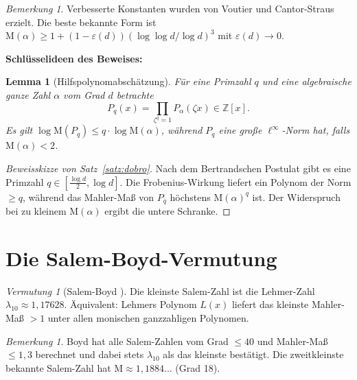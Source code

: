 \documentclass[12pt,a4paper]{amsart}
\newtheorem{lemma}[theorem]{Lemma}
\theoremstyle{definition}
\theoremstyle{remark}
\newtheorem{bemerkung}[theorem]{Bemerkung}
\newtheorem{vermutung}[theorem]{Vermutung}
\newcommand{\Z}{\mathbb{Z}}
\newcommand{\M}{\mathrm{M}}
\begin{document}
\begin{bemerkung}
  Verbesserte Konstanten wurden von Voutier \cite{Voutier1996} und Cantor-Straus
  \cite{CantorStraus1982} erzielt. Die beste bekannte Form ist
  $\M(\alpha) \geq 1 + (1-\varepsilon(d))(\log\log d / \log d)^3$
  mit $\varepsilon(d) \to 0$.
\end{bemerkung}

\textbf{Schlüsselideen des Beweises:}

\begin{lemma}[Hilfspolynomabschätzung]
  Für eine Primzahl $q$ und eine algebraische ganze Zahl $\alpha$ vom Grad $d$ betrachte
  \[
    P_q(x) = \prod_{\zeta^q = 1} P_\alpha(\zeta x) \in \Z[x].
  \]
  Es gilt $\log \M(P_q) \leq q \cdot \log \M(\alpha)$,
  während $P_q$ eine große $\ell^\infty$-Norm hat, falls $\M(\alpha) < 2$.
\end{lemma}

\begin{proof}[Beweisskizze von Satz~\ref{satz:dobro}]
  Nach dem Bertrandschen Postulat gibt es eine Primzahl $q \in [\frac{\log d}{2}, \log d]$.
  Die Frobenius-Wirkung liefert ein Polynom der Norm $\geq q$, während das
  Mahler-Maß von $P_q$ höchstens $\M(\alpha)^q$ ist. Der Widerspruch bei zu kleinem
  $\M(\alpha)$ ergibt die untere Schranke.
\end{proof}

\section{Die Salem-Boyd-Vermutung}\label{sec:salem_boyd}

\begin{vermutung}[Salem-Boyd \cite{Boyd1977}]\label{verm:salemboyd}
  Die kleinste Salem-Zahl ist die Lehmer-Zahl $\lambda_{10} \approx 1{,}17628$.
  Äquivalent: Lehmers Polynom $L(x)$ liefert das kleinste Mahler-Maß $> 1$ unter allen
  monischen ganzzahligen Polynomen.
\end{vermutung}

\begin{bemerkung}
  Boyd \cite{Boyd1977,Boyd1981} hat alle Salem-Zahlen vom Grad $\leq 40$ und
  Mahler-Maß $\leq 1{,}3$ berechnet und dabei stets $\lambda_{10}$ als das kleinste
  bestätigt. Die zweitkleinste bekannte Salem-Zahl hat
  $\M \approx 1{,}1884\ldots$ (Grad 18).
\end{bemerkung}
\end{document}
